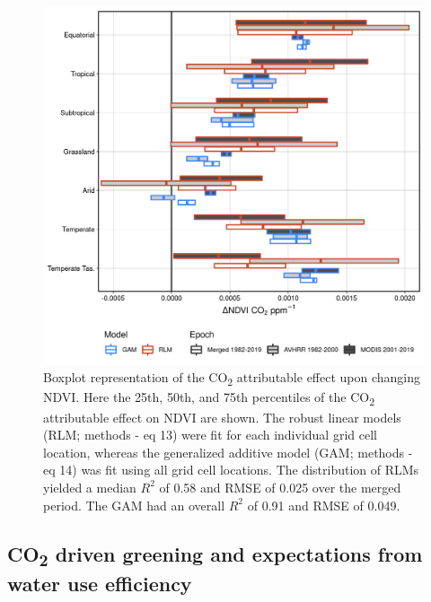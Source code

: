 \documentclass[gc, manuscript]{copernicus}
\begin{document}
\clearpage
\begin{figure}
\includegraphics[width=14cm]{../../figures/Fig6_rlm_CO2_effect_by_epoch} \caption{Boxplot representation of the CO\textsubscript{2} attributable effect upon changing NDVI. Here the 25th, 50th, and 75th percentiles of the CO\textsubscript{2} attributable effect on NDVI are shown. The robust linear models (RLM; methods - eq 13) were fit for each individual grid cell location, whereas the generalized additive model (GAM; methods - eq 14) was fit using all grid cell locations. The distribution of RLMs yielded a median $R^2$ of 0.58 and RMSE of 0.025 over the merged period. The GAM had an overall $R^2$ of 0.91 and RMSE of 0.049.}\label{fig:unnamed-chunk-5}
\end{figure}
\clearpage

\subsection{\texorpdfstring{CO\textsubscript{2} driven greening and
expectations from water use
efficiency}{CO2 driven greening and expectations from water use efficiency}}
\end{document}
